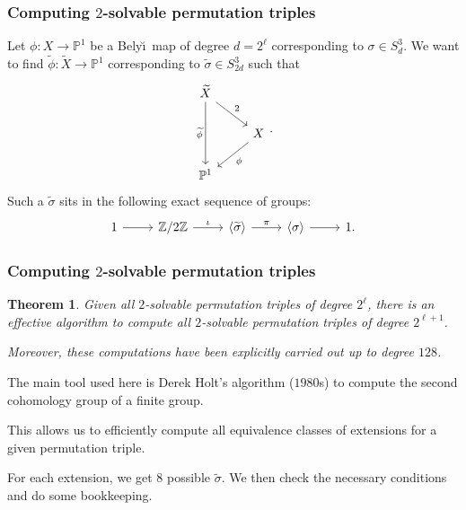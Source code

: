 \documentclass[xcolor=dvipsnames]{beamer}
\theoremstyle{plain}
\newtheorem*{thm}{Theorem}
\newcommand{\PP}{\mathbb P}
\newcommand{\Z}{\mathbb{Z}}
\newcommand{\wt}[1]{\widetilde{#1}}
\newcommand{\Belyi}{Bely\u{\i}}
\begin{document}
  \begin{frame}[plain]
    \frametitle{Computing $2$-solvable permutation triples}
    \pause
    Let $\phi:X\to\PP^1$ be a \Belyi\ map
    of degree $d = 2^\ell$
    corresponding
    \newline
    to $\sigma\in S_d^3$.
    \pause
    We want to find $\wt{\phi}:\wt{X}\to\PP^1$ corresponding
    to $\wt{\sigma}\in S_{2d}^3$ such that
    \pause
    \[
      \begin{tikzcd}[ampersand replacement=\&]
        \widetilde{X}\arrow{dd}[swap]{\widetilde{\phi}}\arrow{dr}{2}\\
        \&X\arrow{dl}{\phi}\\
        \PP^1
      \end{tikzcd}.
    \]
    \pause
    Such a $\wt{\sigma}$ sits in the following exact sequence of groups:
    \pause
    \[
      \begin{tikzcd}[ampersand replacement=\&, row sep = small]
        1\arrow{r}\&\Z/2\Z\arrow{r}{\iota}\&\langle\widetilde{\sigma}\rangle\arrow{r}{\pi}\&\langle\sigma\rangle\arrow{r}\&1.
      \end{tikzcd}
    \]
  \end{frame}
  \begin{frame}[plain]
    \frametitle{Computing $2$-solvable permutation triples}
    \pause
    \begin{thm}
      Given all $2$-solvable permutation triples of degree $2^\ell$,
      there is an effective algorithm to compute all $2$-solvable
      permutation triples of degree $2^{\ell+1}$.
      \pause
      \par
      Moreover, these computations have been explicitly carried out up
      to degree $128$.
    \end{thm}
    \pause
    The main tool used here is Derek Holt's
    algorithm ($1980$s) to compute the second cohomology group
    of a finite group.
    \pause
    \par
    This allows us to efficiently compute all equivalence classes of extensions
    for a given permutation triple.
    \pause
    \par
    For each extension, we get $8$ possible $\wt{\sigma}$.
    \pause
    We then check the necessary conditions and do some bookkeeping.
  \end{frame}
\end{document}
